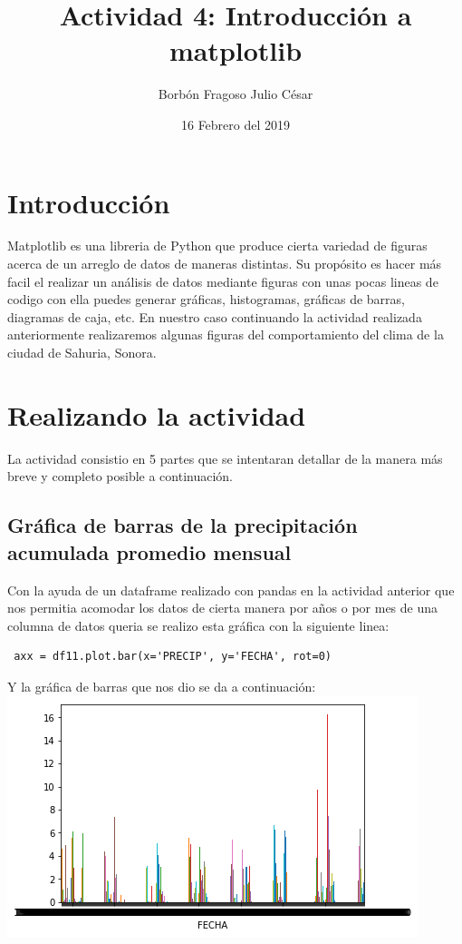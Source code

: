\documentclass{article}
\title{Actividad 4: Introducción a matplotlib}
\author{Borbón Fragoso Julio César }
\date{16 Febrero del 2019}
\begin{document}
\maketitle

\section{Introducción}

Matplotlib es una libreria de Python que produce cierta variedad de figuras acerca de un arreglo de datos de maneras distintas. Su propósito es hacer más facil el realizar un análisis de datos mediante figuras con unas pocas lineas de codigo con ella puedes generar gráficas, histogramas, gráficas de barras, diagramas de caja, etc. En nuestro caso continuando la actividad realizada anteriormente realizaremos algunas figuras del comportamiento del clima de la ciudad de Sahuria, Sonora. 

\section{Realizando la actividad}
La actividad consistio en 5 partes que se intentaran detallar de la manera más breve y completo posible a continuación.
\subsection{Gráfica de barras de la precipitación acumulada promedio mensual}
Con la ayuda de un dataframe realizado con pandas en la actividad anterior que nos permitia acomodar los datos de cierta manera por años o por mes de una columna de datos queria se realizo esta gráfica con la siguiente linea:
 \begin{verbatim} 
 axx = df11.plot.bar(x='PRECIP', y='FECHA', rot=0)
 \end{verbatim}
 Y la gráfica de barras que nos dio se da a continuación:  \\
 \includegraphics[scale=.85]{barrasprecipmensual.png}
 
\end{document}
